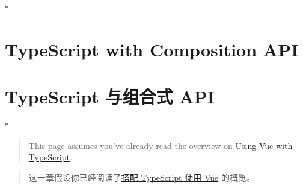 \begin{paracol}{2} 
 
\switchcolumn[0]*%
\section{TypeScript with Composition API}
\switchcolumn
\section{TypeScript 与组合式 API}
\switchcolumn[0]*%
\begin{quote}
This page assumes you've already read the overview on
\href{https://vuejs.org/guide/typescript/overview.html}{Using Vue with
TypeScript}.
\end{quote}
\switchcolumn
\begin{quote}
这一章假设你已经阅读了\href{https://cn.vuejs.org/guide/typescript/overview.html}{搭配
TypeScript 使用 Vue} 的概览。
\end{quote}
\end{paracol}


